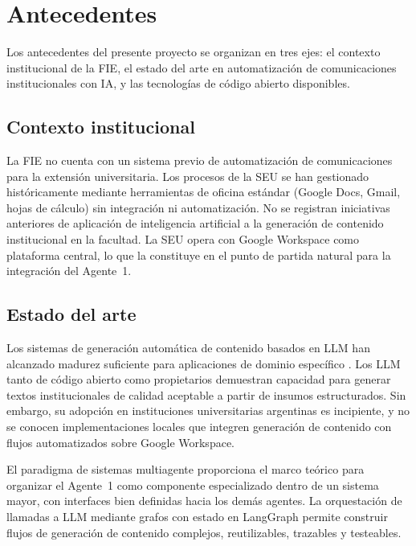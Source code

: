 \documentclass[a4paper, 12pt]{article}
\begin{document}
\section{Antecedentes}

Los antecedentes del presente proyecto se organizan en tres ejes: el contexto institucional de la \ac{FIE}, el estado del arte en automatizaci\'on de comunicaciones institucionales con IA, y las tecnolog\'ias de c\'odigo abierto disponibles.

\subsection{Contexto institucional}

La \ac{FIE} no cuenta con un sistema previo de automatizaci\'on de comunicaciones para la extensi\'on universitaria. Los procesos de la \ac{SEU} se han gestionado hist\'oricamente mediante herramientas de oficina est\'andar (Google Docs, Gmail, hojas de c\'alculo) sin integraci\'on ni automatizaci\'on. No se registran iniciativas anteriores de aplicaci\'on de inteligencia artificial a la generaci\'on de contenido institucional en la facultad. La \ac{SEU} opera con Google Workspace como plataforma central, lo que la constituye en el punto de partida natural para la integraci\'on del Agente~1.

\subsection{Estado del arte}

Los sistemas de generaci\'on autom\'atica de contenido basados en \ac{LLM} han alcanzado madurez suficiente para aplicaciones de dominio espec\'ifico \parencite{russell2021}. Los \ac{LLM} tanto de c\'odigo abierto como propietarios demuestran capacidad para generar textos institucionales de calidad aceptable a partir de insumos estructurados. Sin embargo, su adopci\'on en instituciones universitarias argentinas es incipiente, y no se conocen implementaciones locales que integren generaci\'on de contenido con flujos automatizados sobre Google Workspace.

El paradigma de sistemas multiagente \parencite{wooldridge2009} proporciona el marco te\'orico para organizar el Agente~1 como componente especializado dentro de un sistema mayor, con interfaces bien definidas hacia los dem\'as agentes. La orquestaci\'on de llamadas a \ac{LLM} mediante grafos con estado en LangGraph \parencite{langgraph2026} permite construir flujos de generaci\'on de contenido complejos, reutilizables, trazables y testeables.
\end{document}
